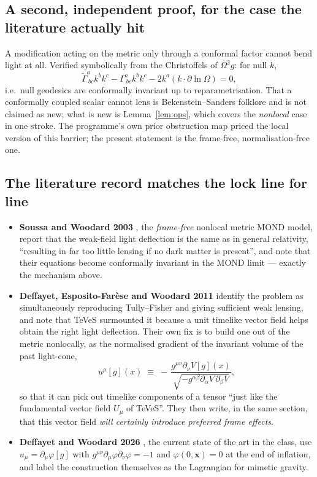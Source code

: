 \documentclass[11pt,letterpaper]{article}
\begin{document}
\subsection{A second, independent proof, for the case the literature actually hit}
A modification acting on the metric only through a conformal factor cannot bend light at all. Verified symbolically from the Christoffels of $\Omega^2g$: for null $k$,
\begin{equation}
\tilde\Gamma^a_{\ bc}k^bk^c-\Gamma^a_{\ bc}k^bk^c-2k^a(k\!\cdot\!\partial\ln\Omega)=0,
\end{equation}
i.e.\ null geodesics are conformally invariant up to reparametrisation. That a conformally coupled scalar cannot lens is Bekenstein--Sanders folklore and is not claimed as new; what is new is Lemma~\ref{lem:ops}, which covers the \emph{nonlocal} case in one stroke. The programme's own prior obstruction map \cite{Zimmerman2026obstruction} priced the local version of this barrier; the present statement is the frame-free, normalisation-free one.

\subsection{The literature record matches the lock line for line}
\begin{itemize}\itemsep2pt
\item \textbf{Soussa and Woodard 2003} \cite{SoussaWoodard2003}, the \emph{frame-free} nonlocal metric MOND model, report that the weak-field light deflection is the same as in general relativity, ``resulting in far too little lensing if no dark matter is present'', and note that their equations become conformally invariant in the MOND limit --- exactly the mechanism above.
\item \textbf{Deffayet, Esposito-Far\`ese and Woodard 2011} \cite{Deffayet2011} identify the problem as simultaneously reproducing Tully--Fisher and giving sufficient weak lensing, and note that TeVeS surmounted it because a unit timelike vector field helps obtain the right light deflection. Their own fix is to build one out of the metric nonlocally, as the normalised gradient of the invariant volume of the past light-cone,
\begin{equation}
u^\mu[g](x)\;\equiv\;-\,\frac{g^{\mu\nu}\partial_\nu V[g](x)}{\sqrt{-g^{\alpha\beta}\partial_\alpha V\,\partial_\beta V}},
\end{equation}
so that it can pick out timelike components of a tensor ``just like the fundamental vector field $U_\mu$ of TeVeS''. They then write, in the same section, that this vector field \emph{will certainly introduce preferred frame effects}.
\item \textbf{Deffayet and Woodard 2026} \cite{DeffayetWoodard2026}, the current state of the art in the class, use $u_\mu=\partial_\mu\varphi[g]$ with $g^{\mu\nu}\partial_\mu\varphi\partial_\nu\varphi=-1$ and $\varphi(0,\mathbf{x})=0$ at the end of inflation, and label the construction themselves as the Lagrangian for mimetic gravity.
\end{itemize}
\end{document}
